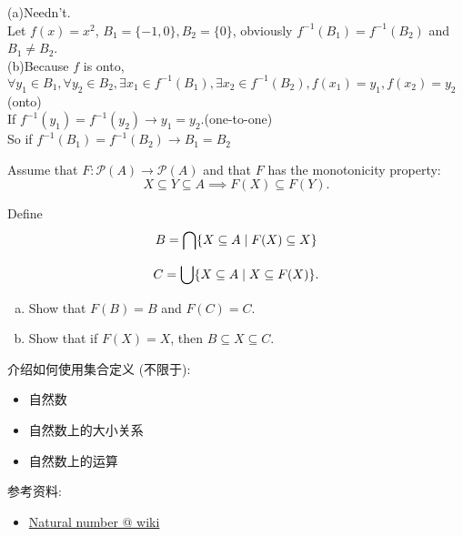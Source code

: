 \documentclass[a4paper, justified]{tufte-handout}
\begin{document}
\begin{solution}
	(a)Needn't.\\
	Let $f(x) = x^2$, $B_1 = \{-1, 0\}, B_2 = \{0\}$, obviously $f^{-1}(B_1) = f^{-1}(B_2)$ and $B_1 \neq B_2$.\\
	(b)Because $f$ is onto, $\forall y_1\in B_1, \forall y_2 \in B_2, \exists x_1 \in f^{-1}(B_1), \exists x_2 \in f^{-1}(B_2), f(x_1) = y_1, f(x_2) = y_2$(onto)\\
	If $f^{-1}(y_1) = f^{-1}(y_2) \rightarrow y_1 = y_2$.(one-to-one)\\
	So if $f^{-1}(B_1) = f^{-1}(B_2) \rightarrow B_1 = B_2$
\end{solution}

\beginoptional

\begin{problem}[Monotonicity]
Assume that $F: \mathcal{P}(A) \to \mathcal{P}(A)$ and that $F$ has the monotonicity property:
\[
	X \subseteq Y \subseteq A \implies F(X) \subseteq F(Y).
\]

\noindent Define
\[
	B = \bigcap \{X \subseteq A \mid F(X) \subseteq X\}
\]

\[
	C = \bigcup \{X \subseteq A \mid X \subseteq F(X)\}.
\]

\begin{enumerate}[(a)]
	\item Show that $F(B) = B$ and $F(C) = C$.
	\item Show that if $F(X) = X$, then $B \subseteq X \subseteq C$.
\end{enumerate}
\end{problem}

\begin{solution}
\end{solution}

\beginot

\begin{ot}[自然数]
	介绍如何使用集合定义 (不限于):
	\begin{itemize}
		\item 自然数
		\item 自然数上的大小关系
		\item 自然数上的运算
	\end{itemize}

	\noindent 参考资料:
	\begin{itemize}
		\item \href{https://en.wikipedia.org/wiki/Natural\_number}{Natural number @ wiki}
	\end{itemize}
\end{ot}
\end{document}
